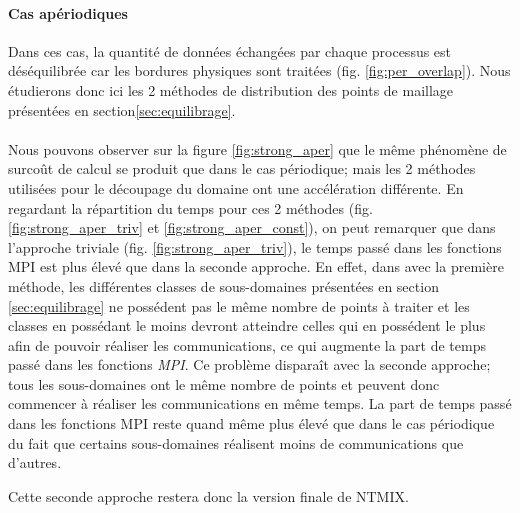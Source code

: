 \paragraph{Cas apériodiques}
Dans ces cas, la quantité de données échangées par chaque processus est déséquilibrée car les bordures physiques sont traitées (fig. \ref{fig:per_overlap}). Nous étudierons donc ici les 2 méthodes de distribution des points de maillage présentées en section\ref{sec:equilibrage}.

\paragraph{}Nous pouvons observer sur la figure \ref{fig:strong_aper} que le même phénomène de surcoût de calcul se produit que dans le cas périodique; mais les 2 méthodes utilisées pour le découpage du domaine ont une accélération différente. En regardant la répartition du temps pour ces 2 méthodes (fig. \ref{fig:strong_aper_triv} et \ref{fig:strong_aper_const}), on peut remarquer que dans l'approche triviale (fig. \ref{fig:strong_aper_triv}), le temps passé dans les fonctions MPI est plus élevé que dans la seconde approche. En effet, dans avec la première méthode, les différentes classes de sous-domaines présentées en section \ref{sec:equilibrage} ne possédent pas le même nombre de points à traiter et les classes en possédant le moins devront atteindre celles qui en possédent le plus afin de pouvoir réaliser les communications, ce qui augmente la part de temps passé dans les fonctions \textit{MPI}. Ce problème disparaît avec la seconde approche; tous les sous-domaines ont le même nombre de points et peuvent donc commencer à réaliser les communications en même temps. La part de temps passé dans les fonctions MPI reste quand même plus élevé que dans le cas périodique du fait que certains sous-domaines réalisent moins de communications que d'autres.

Cette seconde approche restera donc la version finale de NTMIX.


